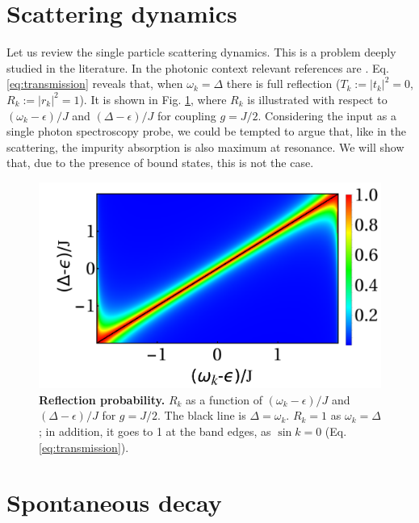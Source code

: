 \documentclass[aps,pra,twocolumn,floatfix,superscriptaddress]{revtex4-1}%
\begin{document}
\section{Scattering dynamics}\label{sec:scatt}
Let us review the single particle scattering dynamics.  
This is a problem deeply studied in the literature.  In the photonic context relevant references are \cite{Nori2008a, Fan2005a, Fan2005b}.
Eq. \eqref{eq:transmission} reveals that, 
 when $\omega_k=\Delta$ there is full reflection ($T_k:=|t_k|^2=0$, $R_k:=|r_k|^2 = 1$). 
 It is shown in Fig. \ref{fig:R}, where $R_k$ is illustrated with respect to $(\omega_k-\epsilon)/J$ and $(\Delta-\epsilon)/J$ for coupling $g=J/2$. 
Considering the  input as a  single photon spectroscopy probe,  we could be tempted to argue that, like in the scattering, the impurity absorption is also maximum at resonance.  We will show that, due to the presence of bound states, this is not the case. 

\begin{figure}[thb!]
\begin{center}
\includegraphics[width=1.\columnwidth]{R_vs_w_Delta_g_0_5.pdf}
\caption{{\bf Reflection probability.} $R_k$ as a function of $(\omega_k-\epsilon)/J$ and $(\Delta-\epsilon)/J$ for $g=J/2$. The black line is $\Delta=\omega_k$. $R_k=1$ as $\omega_k=\Delta$; in addition, it goes to 1 at the band edges, as $\sin k=0$ (Eq. \eqref{eq:transmission}).}\label{fig:R}
\end{center}
\end{figure}


\section{Spontaneous decay}\label{sec:spontaneous_decay}
\end{document}
